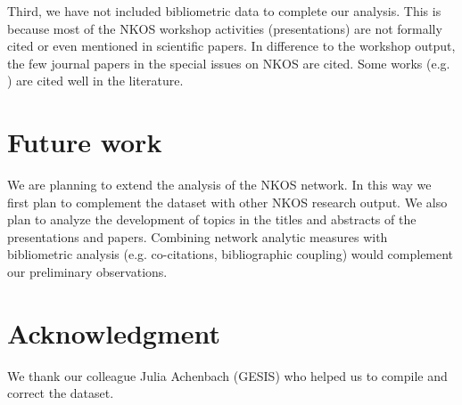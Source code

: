 \documentclass[runningheads,a4paper]{llncs}
\begin{document}
Third, we have not included bibliometric data to complete our analysis. This is because most of the NKOS workshop activities (presentations) are not formally cited or even mentioned in scientific papers. In difference to the workshop output, the few journal papers in the special issues on NKOS are cited. Some works (e.g. \cite{SPCranefield2001,SPDoerr2001,SPTudhope2001,SPSoergel2004,SPTrant2006}) are cited well in the literature. 



\section{Future work}\label{future}
We are planning to extend the analysis of the NKOS network. In this way we first plan to complement the dataset with other NKOS research output. We also plan to analyze the development of topics in the titles and abstracts of the presentations and papers. Combining network analytic measures with bibliometric analysis (e.g. co-citations, bibliographic coupling) would complement our preliminary observations.

\section{Acknowledgment}\label{sec:ACKNOWLEDGMENTS}
We thank our colleague Julia Achenbach (GESIS) who helped us to compile and correct the dataset.

\newpage

 
\end{document}
